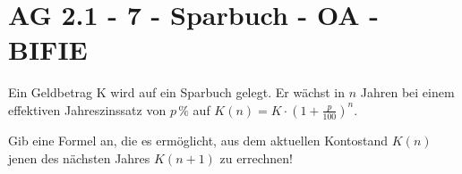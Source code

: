 \section{AG 2.1 - 7 - Sparbuch - OA - BIFIE}

\begin{beispiel}[AG 2.1]{1} %
Ein Geldbetrag K wird auf ein Sparbuch gelegt. Er wächst in $n$ Jahren bei einem effektiven Jahreszinssatz von $p\,\%$ auf $K(n)=K\cdot \left(1+\frac{p}{100}\right)^n$.

Gib eine Formel an, die es ermöglicht, aus dem aktuellen Kontostand $K(n)$ jenen des nächsten Jahres $K(n+1)$ zu errechnen!	


\end{beispiel}
